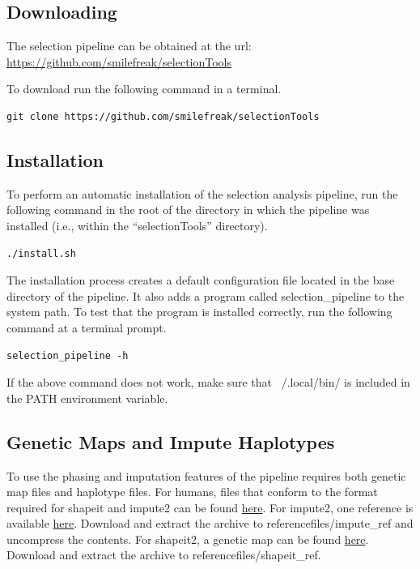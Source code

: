 \documentclass[a4paper,10pt]{article}
\begin{document}
\subsection{Downloading}
The selection pipeline can be obtained at the url:
\href{https://github.com/smilefreak/selectionTools}
{https://github.com/smilefreak/selectionTools}

\noindent
To download run the following command in a terminal.

\begin{verbatim}
git clone https://github.com/smilefreak/selectionTools
\end{verbatim}

\subsection{Installation}

\noindent
To perform an automatic installation of the selection
analysis pipeline, run the following command in the root of the
directory in which the pipeline was installed (i.e., within the
``selectionTools'' directory).\\
\begin{verbatim}
./install.sh
\end{verbatim}

\noindent
The installation process creates a default configuration file located in the base
directory of the pipeline. It also adds a program called
selection\_pipeline to the system path. To test that the program is
installed correctly, run the following command at a terminal prompt.

\begin{verbatim}
selection_pipeline -h
\end{verbatim}

\noindent
If the above command does not work, make sure that ~/.local/bin/ is included in the PATH environment variable.

\subsection{Genetic Maps and Impute Haplotypes}
To use the phasing and imputation features of the pipeline requires
both genetic map files and haplotype files. For humans, files
that conform to the format required for shapeit and impute2 can be
found
\href{http://mathgen.stats.ox.ac.uk/impute/impute_v2.html#reference}{here}. For
impute2, one reference is available
\href{http://mathgen.stats.ox.ac.uk/impute/ALL_1000G_phase1integrated_v3_impute_macGT1.tgz}{here}.
Download and extract the archive to referencefiles/impute\_ref and
uncompress the contents. For shapeit2, a genetic map can be found
\href{http://www.shapeit.fr/files/genetic_map_b37.tar.gz}{here}.
Download and extract the archive to referencefiles/shapeit\_ref.\\
\end{document}
